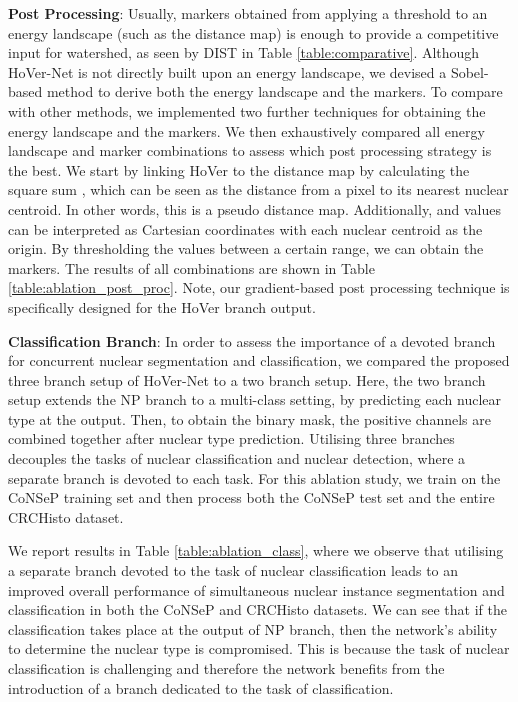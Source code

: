\documentclass[journal]{IEEEtran}
\begin{document}
	\textbf{Post Processing}: Usually, markers obtained from applying a threshold to an energy landscape (such as the distance map) is enough to provide a competitive input for watershed, as seen by DIST in Table \ref{table:comparative}. Although HoVer-Net is not directly built upon an energy landscape, we devised a Sobel-based method to derive both the energy landscape and the markers. To compare with other methods, we implemented two further techniques for obtaining the energy landscape and the markers. We then exhaustively compared all energy landscape and marker combinations to assess which post processing strategy is the best. We start by linking HoVer to the distance map by calculating the square sum , which can be seen as the distance from a pixel to its nearest nuclear centroid. In other words, this is a pseudo distance map. Additionally,  and  values can be interpreted as Cartesian coordinates with each nuclear centroid as the origin. By thresholding the values between a certain range, we can obtain the markers. The results of all combinations are shown in Table \ref{table:ablation_post_proc}. Note, our gradient-based post processing technique is specifically designed for the HoVer branch output.
	
	\textbf{Classification Branch}: In order to assess the importance of a devoted branch for concurrent nuclear segmentation and classification, we compared the proposed three branch setup of HoVer-Net to a two branch setup. Here, the two branch setup extends the NP branch to a multi-class setting, by predicting each nuclear type at the output. Then, to obtain the binary mask, the positive channels are combined together after nuclear type prediction. Utilising three branches decouples the tasks of nuclear classification and nuclear detection, where a separate branch is devoted to each task. For this ablation study, we train on the CoNSeP training set and then process both the CoNSeP test set and the entire CRCHisto dataset.
	
	We report results in Table \ref{table:ablation_class}, where we observe that utilising a separate branch devoted to the task of nuclear classification leads to an improved overall performance of simultaneous nuclear instance segmentation and classification in both the CoNSeP and CRCHisto datasets. We can see that if the classification takes place at the output of NP branch, then the network's ability to determine the nuclear type is compromised. This is because the task of nuclear classification is challenging and therefore the network benefits from the introduction of a branch dedicated to the task of classification.  
	
\end{document}
